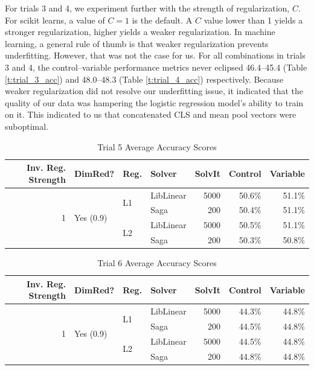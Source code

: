 \documentclass[12pt,letterpaper]{article}
\begin{document}
For trials 3 and 4, we experiment further with the strength of regularization, $C$. For scikit learns, a value of $C=1$ is the default. A $C$ value lower than 1 yields a stronger regularization, higher yields a weaker regularization. In machine learning, a general rule of thumb is that weaker regularization prevents underfitting. However, that was not the case for us. For all combinations in trials 3 and 4, the control--variable performance metrics never eclipsed 46.4--45.4 (Table \ref{t:trial_3_acc}) and 48.0--48.3 (Table \ref{t:trial_4_acc}) respectively. Because weaker regularization did not resolve our underfitting issue, it indicated that the quality of our data was hampering the logistic regression model's ability to train on it. This indicated to us that concatenated CLS and mean pool vectors were suboptimal. 










\begin{table}[!ht]
    \centering
    \begin{tabular}{|r|l|l|l|r|r|r|}
    \hline
         Inv. Reg. Strength & DimRed? & Reg. & Solver & SolvIt & Control & Variable \\ \hline
        \multirow{4}{*}{1} & \multirow{4}{*}{Yes (0.9)} & \multirow{2}{*}{L1} & LibLinear & 5000 & 50.6\% & 51.1\% \\ \cline{4-7}
         &  &  & Saga & 200 & 50.4\% & 51.1\% \\ \cline{3-7}
         &  & \multirow{2}{*}{L2} & LibLinear & 5000 & 50.5\% & 51.1\% \\ \cline{4-7}
         &  &  & Saga & 200 & 50.3\% & 50.8\% \\ \hline
    \end{tabular}
    \caption{Trial 5 Average Accuracy Scores}
    \label{t:trial_5_acc}
\end{table}


\begin{table}[!ht]
    \centering
    \begin{tabular}{|r|l|l|l|r|r|r|}
    \hline
        Inv. Reg. Strength & DimRed? & Reg. & Solver & SolvIt & Control & Variable\\ \hline
        \multirow{4}{*}{1} & \multirow{4}{*}{Yes (0.9)} & \multirow{2}{*}{L1} & LibLinear & 5000 & 44.3\% & 44.8\% \\ \cline{4-7}
         &  &  & Saga & 200 & 44.5\% & 44.8\% \\ \cline{3-7}
         &  & \multirow{2}{*}{L2} & LibLinear & 5000 & 44.5\% & 44.8\% \\ \cline{4-7}
         &  &  & Saga & 200 & 44.8\% & 44.8\% \\ \hline
    \end{tabular}
    \caption{Trial 6 Average Accuracy Scores}
    \label{t:trial_6_acc}
\end{table}
\end{document}
